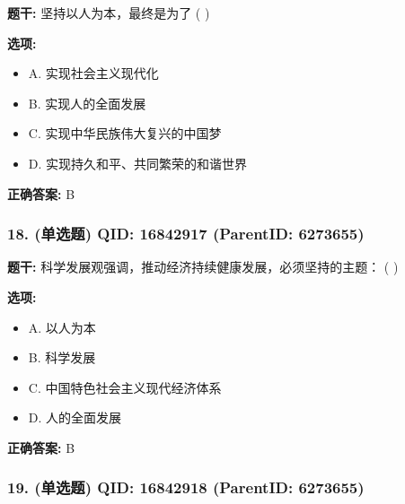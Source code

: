 \documentclass[12pt,UTF8]{ctexart}
\begin{document}
\textbf{题干:}
坚持以人为本，最终是为了 ( )



\textbf{选项:}
\begin{itemize}[leftmargin=*]

  \item A. 实现社会主义现代化

  \item B. 实现人的全面发展

  \item C. 实现中华民族伟大复兴的中国梦

  \item D. 实现持久和平、共同繁荣的和谐世界

\end{itemize}

\textbf{正确答案:}
B

\vspace{0.3em}\hrulefill\vspace{0.7em}

\subsubsection*{18. (单选题) \small QID: 16842917 (ParentID: 6273655)}

\textbf{题干:}
科学发展观强调，推动经济持续健康发展，必须坚持的主题： ( )



\textbf{选项:}
\begin{itemize}[leftmargin=*]

  \item A. 以人为本

  \item B. 科学发展

  \item C. 中国特色社会主义现代经济体系

  \item D. 人的全面发展

\end{itemize}

\textbf{正确答案:}
B

\vspace{0.3em}\hrulefill\vspace{0.7em}

\subsubsection*{19. (单选题) \small QID: 16842918 (ParentID: 6273655)}
\end{document}

